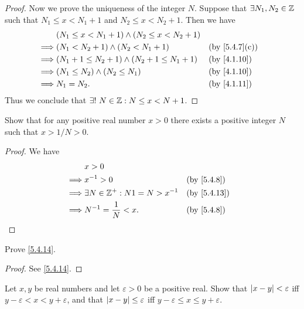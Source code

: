 \begin{proof}
	Now we prove the uniqueness of the integer \(N\).
	Suppose that \(\exists N_1, N_2 \in \mathbb{Z}\) such that \(N_1 \leq x < N_1 + 1\) and \(N_2 \leq x < N_2 + 1\).
	Then we have
	\begin{align*}
		         & (N_1 \leq x < N_1 + 1) \land (N_2 \leq x < N_2 + 1)                                  \\
		\implies & (N_1 < N_2 + 1) \land (N_2 < N_1 + 1)               &  & \text{(by \cref{5.4.7}(c))} \\
		\implies & (N_1 + 1 \leq N_2 + 1) \land (N_2 + 1 \leq N_1 + 1) &  & \by{4.1.10}                 \\
		\implies & (N_1 \leq N_2) \land (N_2 \leq N_1)                 &  & \by{4.1.10}                 \\
		\implies & N_1 = N_2.                                          &  & \by{4.1.11}
	\end{align*}
	Thus we conclude that \(\exists!\ N \in \mathbb{Z} : N \leq x < N + 1\).
\end{proof}

\begin{ex}\label{ex:5.4.4}
	Show that for any positive real number \(x > 0\) there exists a positive integer \(N\) such that \(x > 1 / N > 0\).
\end{ex}

\begin{proof}
	We have
	\begin{align*}
		         & x > 0                                                 \\
		\implies & x^{-1} > 0                           &  & \by{5.4.8}  \\
		\implies & \exists N \in \Z^+ : N1 = N > x^{-1} &  & \by{5.4.13} \\
		\implies & N^{-1} = \dfrac{1}{N} < x.           &  & \by{5.4.8}
	\end{align*}
\end{proof}

\begin{ex}\label{ex:5.4.5}
	Prove \cref{5.4.14}.
\end{ex}

\begin{proof}
	See \cref{5.4.14}.
\end{proof}

\begin{ex}\label{ex:5.4.6}
	Let \(x, y\) be real numbers and let \(\varepsilon > 0\) be a positive real.
	Show that \(\left\lvert x - y\right\rvert < \varepsilon\) iff \(y - \varepsilon < x < y + \varepsilon\), and that \(\left\lvert x - y\right\rvert \leq \varepsilon\) iff \(y - \varepsilon \leq x \leq y + \varepsilon\).
\end{ex}

